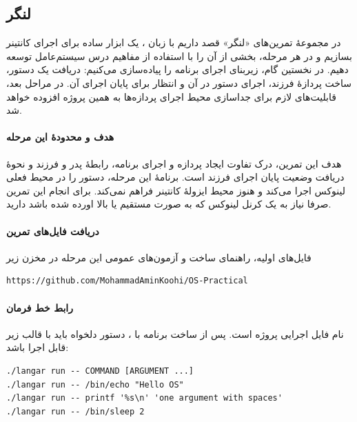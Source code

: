 \subsection*{لنگر}

در مجموعهٔ تمرین‌های «لنگر» قصد داریم با زبان ، یک ابزار ساده برای
اجرای کانتینر بسازیم و در هر مرحله، بخشی از آن را با استفاده از مفاهیم
درس سیستم‌عامل توسعه دهیم. در نخستین گام، زیربنای اجرای برنامه را پیاده‌سازی
می‌کنیم: دریافت یک دستور، ساخت پردازهٔ فرزند، اجرای دستور در آن و انتظار
برای پایان اجرای آن. در مراحل بعد، قابلیت‌های لازم برای جداسازی محیط اجرای
پردازه‌ها به همین پروژه افزوده خواهد شد.

\paragraph{هدف و محدودهٔ این مرحله}
هدف این تمرین، درک تفاوت ایجاد پردازه و اجرای برنامه، رابطهٔ پدر و فرزند
و نحوهٔ دریافت وضعیت پایان اجرای فرزند است. برنامهٔ این مرحله، دستور را
در محیط فعلی لینوکس اجرا می‌کند و هنوز محیط ایزولهٔ کانتینر فراهم نمی‌کند.
برای انجام این تمرین صرفا نیاز به یک کرنل لینوکس که به صورت مستقیم یا  بالا اورده شده باشد دارید.

\paragraph{دریافت فایل‌های تمرین}
فایل‌های اولیه، راهنمای ساخت و آزمون‌های عمومی این مرحله در مخزن زیر

\begin{latin}
\begin{verbatim}
https://github.com/MohammadAminKoohi/OS-Practical
\end{verbatim}
\end{latin}

\paragraph{رابط خط فرمان}
نام فایل اجرایی پروژه  است. پس از ساخت برنامه با
، دستور دلخواه باید با قالب زیر قابل اجرا باشد:

\begin{latin}
\begin{verbatim}
./langar run -- COMMAND [ARGUMENT ...]
./langar run -- /bin/echo "Hello OS"
./langar run -- printf '%s\n' 'one argument with spaces'
./langar run -- /bin/sleep 2
\end{verbatim}
\end{latin}

